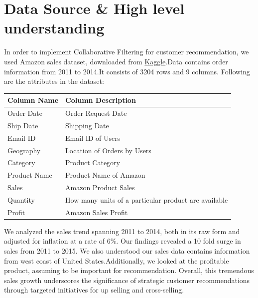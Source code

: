 \documentclass[11pt]{article} %
\begin{document}
\section{Data Source \& High level understanding}
In order to implement Collaborative Filtering for customer recommendation, we used Amazon sales dataset\cite{1}, downloaded from \href{https://www.kaggle.com/datasets/anandshaw2001/amazon-sales-dataset}{Kaggle}.Data contains order information from 2011 to 2014.It consists of 3204 rows and 9 columns. Following are the attributes in the dataset: 
\begin{table}[H]
\centering
\begin{tabular}{@{}ll@{}}
\toprule
\textbf{Column Name} & \textbf{Column Description}                          \\ \midrule
Order Date           & Order Request Date                                   \\
Ship Date            & Shipping Date                                        \\
Email ID             & Email ID of Users                                    \\
Geography            & Location of Orders by Users                          \\
Category             & Product Category                                     \\
Product Name         & Product Name of Amazon                               \\
Sales                & Amazon Product Sales                                 \\
Quantity             & How many units of a particular product are available \\
Profit               & Amazon Sales Profit                                  \\ \bottomrule
\end{tabular}
\end{table}
We analyzed the sales trend spanning 2011 to 2014, both in its raw form and adjusted for inflation at a rate of 6\%. Our findings revealed a 10 fold surge in sales from 2011 to 2015. We also understood our sales data contains information from west coast of United States.Additionally, we looked at the profitable product, assuming to be important for recommendation. Overall, this tremendous sales growth underscores the significance of strategic customer recommendations through targeted initiatives for up selling and cross-selling.
\end{document}
